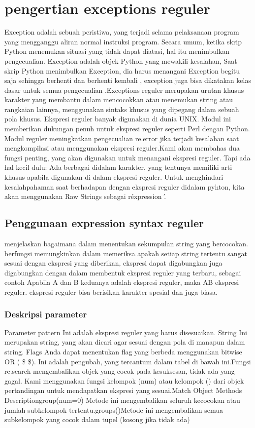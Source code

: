\section {pengertian exceptions reguler}
Exception adalah sebuah peristiwa, yang terjadi selama pelaksanaan program yang mengganggu aliran normal instruksi program. Secara umum, ketika skrip Python menemukan situasi yang tidak dapat diatasi, hal itu menimbulkan pengecualian. Exception adalah objek Python yang mewakili kesalahan, Saat  skrip Python menimbulkan Exception, dia harus menangani Exception begitu saja sehingga berhenti dan berhenti kembali , exception juga bisa dikatakan kelas dasar untuk semua pengecualian .Exceptions reguler merupakan urutan khusus karakter yang membantu dalam mencocokkan atau menemukan string atau rangkaian lainnya, menggunakan sintaks khusus yang dipegang dalam sebuah pola khusus. Ekspresi reguler banyak digunakan di dunia UNIX. Modul ini memberikan dukungan penuh untuk ekspresi reguler seperti Perl dengan Python. Modul reguler meningkatkan pengecualian re.error jika terjadi kesalahan saat mengkompilasi atau menggunakan ekspresi reguler.Kami akan membahas dua fungsi penting, yang akan digunakan untuk menangani ekspresi reguler. Tapi ada hal kecil dulu: Ada berbagai didalam karakter, yang tentunya memiliki arti khusus apabila digunakan di dalam ekspresi reguler. Untuk menghindari kesalahpahaman  saat berhadapan dengan ekspresi reguler didalam pyhton, kita akan menggunakan Raw Strings sebagai r\'expression \'.

\subsection{Penggunaan expression syntax reguler}
menjelaskan bagaimana dalam menentukan sekumpulan string yang bercocokan. berfungsi memungkinkan dalam memeriksa apakah setiap string
tertentu sangat sesuai dengan ekspresi yang diberikan, ekspresi dapat digabungkan juga digabungkan dengan dalam membentuk ekspresi reguler yang terbaru, sebagai contoh Apabila A dan B  keduanya adalah ekspresi reguler, maka AB ekspresi reguler. ekspresi reguler 
bisa berisikan karakter spesial dan juga biasa.

\subsubsection{Deskripsi parameter}
Parameter pattern Ini adalah ekspresi reguler yang harus disesuaikan. String Ini merupakan string, yang akan dicari agar sesuai dengan pola di manapun dalam string. Flags Anda dapat menentukan flag yang berbeda menggunakan bitwise OR ( \$  \vert  \$). Ini adalah pengubah, yang tercantum dalam tabel di bawah ini.Fungsi re.search mengembalikan objek yang cocok pada kesuksesan, tidak ada yang gagal. Kami menggunakan fungsi kelompok (num) atau kelompok () dari objek pertandingan untuk mendapatkan ekspresi yang sesuai.Match Object Methods Descriptiongroup(num=0) Metode ini mengembalikan seluruh kecocokan atau jumlah subkelompok tertentu.groups()Metode ini mengembalikan semua subkelompok yang cocok dalam tupel (kosong jika tidak ada) 

